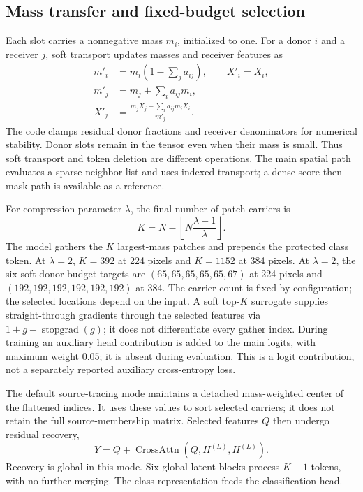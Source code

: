 \subsection{Mass transfer and fixed-budget selection}

Each slot carries a nonnegative mass $m_i$, initialized to one. For a donor
$i$ and a receiver $j$, soft transport updates masses and receiver features as
\begin{align}
 m'_i &=m_i\left(1-\sum_j a_{ij}\right),\qquad X'_i=X_i,\\
 m'_j &=m_j+\sum_i a_{ij}m_i,\\
 X'_j &=\frac{m_jX_j+\sum_i a_{ij}m_iX_i}{m'_j}.
 \label{eq:transport}
\end{align}
The code clamps residual donor fractions and receiver denominators for
numerical stability. Donor slots remain in the tensor even when their mass
is small. Thus soft transport and token deletion are different operations.
The main spatial path evaluates a sparse neighbor list and uses indexed
transport; a dense score-then-mask path is available as a reference.

For compression parameter $\lambda$, the final number of patch carriers is
\begin{equation}
 K=N-\left\lfloor N\frac{\lambda-1}{\lambda}\right\rfloor.
 \label{eq:budget}
\end{equation}
The model gathers the $K$ largest-mass patches and prepends the protected
class token. At $\lambda=2$, $K=392$ at 224 pixels and $K=1152$ at 384 pixels.
At $\lambda=2$, the six soft donor-budget targets are
$(65,65,65,65,65,67)$ at 224 pixels and $(192,192,192,192,192,192)$ at 384.
The carrier count is fixed by configuration; the selected locations depend
on the input. A soft top-$K$ surrogate supplies straight-through gradients
through the selected features via $1+g-\operatorname{stopgrad}(g)$; it does
not differentiate every gather index. During training an auxiliary head contribution
is added to the main logits, with maximum weight 0.05; it is absent during
evaluation. This is a logit contribution, not a separately reported auxiliary
cross-entropy loss.

The default source-tracing mode maintains a detached mass-weighted center of
the flattened indices. It uses these values to sort selected carriers; it
does not retain the full source-membership matrix. Selected features $Q$
then undergo residual recovery,
\begin{equation}
 Y=Q+\operatorname{CrossAttn}(Q,H^{(L)},H^{(L)}).
 \label{eq:recovery}
\end{equation}
Recovery is global in this mode. Six global latent blocks process $K+1$
tokens, with no further merging. The class representation feeds the
classification head.

